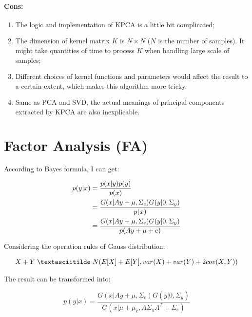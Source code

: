\documentclass[12pt,a4paper]{article}
\theoremstyle{definition}
\begin{document}
\vspace{-0.03\linewidth}
\paragraph{Cons:}
\begin{enumerate}
	\item The logic and implementation of KPCA is a little bit complicated;
	
	\item The dimension of kernel matrix $K$ is $N \times N$ ($N$ is the number of samples). It might take quantities of time to process $K$ when handling large scale of samples;
	
	\item Different choices of kernel functions and parameters would affect the result to a certain extent, which makes this algorithm more tricky.
	
	\item Same as PCA and SVD, the actual meanings of principal components extracted by KPCA are also inexplicable.
\end{enumerate}

\section{Factor Analysis (FA)}

According to Bayes formula, I can get:

\vspace{-0.03\linewidth}
\begin{large}
\begin{align*}
	\centering	
	p(y|x) &= \dfrac{p(x|y)p(y)}{p(x)} \\
	&= \dfrac{G(x|Ay+\mu,\Sigma_{e})G(y|0,\Sigma_{y})}{p(x)} \\
	&= \dfrac{G(x|Ay+\mu,\Sigma_{e})G(y|0,\Sigma_{y})}{p(Ay+\mu+e)}
\end{align*}
\end{large}

Considering the operation rules of Gauss distribution:

\begin{large}
\begin{equation*}
	X + Y \; \textasciitilde \; N(E[X] + E[Y], var(X)+var(Y)+2cov(X, Y))
\end{equation*}
\end{large}

The result can be transformed into:

\begin{large}
\begin{equation*}
	p(y|x) = \dfrac{G(x|Ay+\mu,\Sigma_{e})G(y|0,\Sigma_{y})}{G(x|\mu+\mu_{e},A\Sigma_{y}A^{T}+\Sigma_{e})}
\end{equation*}
\end{large}
\end{document}
